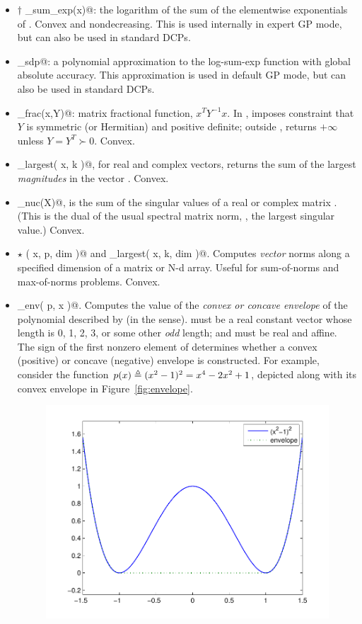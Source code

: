 \documentclass[12pt]{article}
\begin{document}
\begin{itemize}
\item $\dagger$ \verb@log_sum_exp(x)@: the
logarithm of the sum of the elementwise exponentials of \verb@x@.
Convex and nondecreasing.
This is used internally in expert GP mode, but can also be used in standard
DCPs.
\item \verb@logsumexp_sdp@: a polynomial approximation to the log-sum-exp
function with global absolute accuracy. 
This approximation is used in default GP
mode, but can also be used in standard DCPs.
\item \verb@matrix_frac(x,Y)@: matrix fractional function,
$x^TY^{-1}x$.  In \cvx, imposes constraint that $Y$ is 
symmetric (or Hermitian) and positive definite; outside \cvx,
returns $+\infty$ unless $Y=Y^T\succ 0$.
Convex. 
\item \verb@norm_largest( x, k )@, for real and complex vectors,
returns the sum of the largest \verb@k@ \emph{magnitudes} in the
vector \verb@x@.
Convex.
\item \verb@norm_nuc(X)@, 
is the sum of the singular values of a real or complex matrix \verb@X@.
(This is the dual of the usual spectral matrix norm, \ie,
the largest singular value.)
Convex.
\item $\star$ \verb@norms( x, p, dim )@ and \verb@norms_largest( x, k, dim )@.
Computes \emph{vector} norms along a specified dimension of a matrix
or N-d array. Useful for sum-of-norms and max-of-norms problems.
Convex.
\item \verb@poly_env( p, x )@. 
Computes the value of the \emph{convex or concave envelope} of the polynomial
described by \verb@p@ (in the \verb@polyval@ sense). \verb@p@ must be
a real constant vector whose length \verb@n@ is 0, 1, 2, 3, or some other
\emph{odd} length; and \verb@x@ must be real and affine. The sign of the
first nonzero element of \verb@p@ determines whether a convex (positive)
or concave (negative) envelope is constructed.
For example, consider the function $p(x)\triangleq (x^2-1)^2=x^4-2x^2+1$,
depicted along with its convex envelope in Figure~\ref{fig:envelope}.
\begin{figure}
\begin{center}
\includegraphics[width=4.5in]{envelope}

\end{center}
\end{figure}
\end{itemize}
\end{document}
